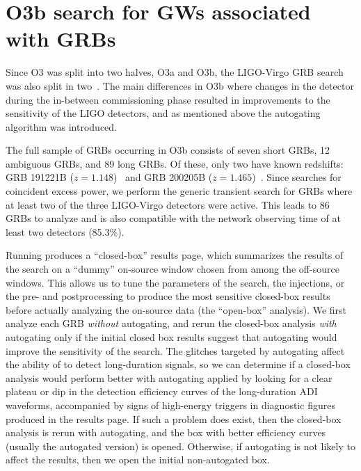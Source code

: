 \section{O3b search for GWs associated with GRBs}\label{sec:grb-o3b}

Since \ac{O3} was split into two halves, O3a and O3b, the \ac{LIGO}-Virgo \ac{GRB} search was also split in two~\citep{grb_o3a,grb_o3b}.
The main differences in O3b where changes in the detector during the in-between commissioning phase resulted in improvements to the sensitivity of the LIGO detectors, and as mentioned above the autogating algorithm was introduced.

The full sample of \acp{GRB} occurring in O3b consists of seven short \acp{GRB}, 12 ambiguous \acp{GRB}, and 89 long \acp{GRB}.
Of these, only two have known redshifts: GRB 191221B ($z = 1.148$)~\citep{Kuin_2019, Vielfaure_2019} and GRB 200205B ($z = 1.465$)~\citep{Vielfaure_2020}.
Since \xpip searches for coincident excess power, we perform the generic transient search for \acp{GRB} where at least two of the three LIGO-Virgo detectors were active.
This leads to 86 GRBs to analyze and is also compatible with the network observing time of at least two detectors (85.3\%).

Running \xpip produces a ``closed-box'' results page, which summarizes the results of the search on a ``dummy'' on-source window chosen from among the off-source windows.
This allows us to tune the parameters of the search, the injections, or the pre- and postprocessing to produce the most sensitive closed-box results before actually analyzing the on-source data (the ``open-box'' analysis).
We first analyze each \ac{GRB} \textit{without} autogating, and rerun the closed-box analysis \textit{with} autogating only if the initial closed box results suggest that autogating would improve the sensitivity of the search.
The glitches targeted by autogating affect the ability of \xpip to detect long-duration signals, so we can determine if a closed-box analysis would perform better with autogating applied by looking for a clear plateau or dip in the detection efficiency curves of the long-duration \ac{ADI} waveforms, accompanied by signs of high-energy triggers in diagnostic figures produced in the results page.
If such a problem does exist, then the closed-box analysis is rerun with autogating, and the box with better efficiency curves (usually the autogated version) is opened.
Otherwise, if autogating is not likely to affect the results, then we open the initial non-autogated box.

